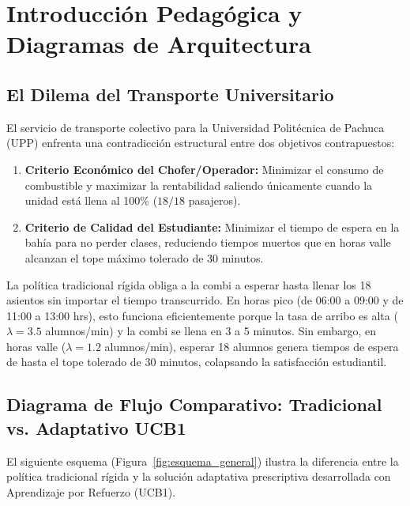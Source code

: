 \documentclass[12pt,letterpaper]{article}
\begin{document}
\clearpage
{}
\tableofcontents
\clearpage

\section{Introducción Pedagógica y Diagramas de Arquitectura}

\subsection{El Dilema del Transporte Universitario}
El servicio de transporte colectivo para la Universidad Politécnica de Pachuca (UPP) enfrenta una contradicción estructural entre dos objetivos contrapuestos:

\begin{enumerate}
	\item \textbf{Criterio Económico del Chofer/Operador:} Minimizar el consumo de combustible y maximizar la rentabilidad saliendo únicamente cuando la unidad está llena al 100\% ($18/18$ pasajeros).
	\item \textbf{Criterio de Calidad del Estudiante:} Minimizar el tiempo de espera en la bahía para no perder clases, reduciendo tiempos muertos que en horas valle alcanzan el tope máximo tolerado de 30 minutos.
\end{enumerate}

La política tradicional rígida obliga a la combi a esperar hasta llenar los 18 asientos sin importar el tiempo transcurrido. En horas pico (de 06:00 a 09:00 y de 11:00 a 13:00 hrs), esto funciona eficientemente porque la tasa de arribo es alta ($\lambda = 3.5$ alumnos/min) y la combi se llena en 3 a 5 minutos. Sin embargo, en horas valle ($\lambda = 1.2$ alumnos/min), esperar 18 alumnos genera tiempos de espera de hasta el tope tolerado de 30 minutos, colapsando la satisfacción estudiantil.

\newpage
\subsection{Diagrama de Flujo Comparativo: Tradicional vs. Adaptativo UCB1}
El siguiente esquema (Figura~\ref{fig:esquema_general}) ilustra la diferencia entre la política tradicional rígida y la solución adaptativa prescriptiva desarrollada con Aprendizaje por Refuerzo (UCB1).
\end{document}

